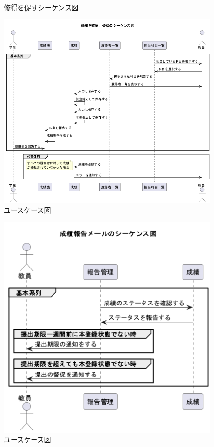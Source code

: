\documentclass[documentclass]{jsarticle}
\begin{document}
\begin{figure}[H]
\begin{minipage}[b]{0.49\columnwidth}
      \caption{修得を促すシーケンス図}
      \label{fig:6-5}
  \end{minipage}
\end{figure}

\begin{figure}[H]
  \begin{center}
    \includegraphics*[scale=0.5]{figure/6-4.png}
  \end{center}
  \caption{ユースケース図}
  \label{fig:6-4}
\end{figure}

\begin{figure}[H]
  \begin{center}
    \includegraphics*[scale=0.5]{figure/6-6.png}
  \end{center}
  \caption{ユースケース図}
  \label{fig:6-6}
\end{figure}
\end{document}
